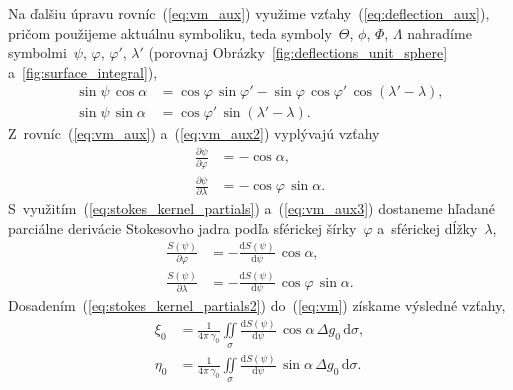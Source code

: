 \documentclass[a4paper,12pt]{book}
\newcommand{\diff}{\mathrm d}
\begin{document}
%
Na ďalšiu úpravu rovníc~(\ref{eq:vm_aux}) využime 
vzťahy~(\ref{eq:deflection_aux}), pričom použijeme aktuálnu symboliku, teda 
symboly~$\Theta$, $\phi$, $\Phi$, $\Lambda$ nahradíme symbolmi~$\psi$, 
$\varphi$, $\varphi'$, $\lambda'$ (porovnaj 
Obrázky~\ref{fig:deflections_unit_sphere} a~\ref{fig:surface_integral}),
%
\begin{equation}
\label{eq:vm_aux2}
\begin{split}
\sin\psi \, \cos\alpha &= \cos\varphi \, \sin\varphi' - \sin\varphi \, 
\cos\varphi' \, \cos(\lambda' - \lambda){,}\\
\sin\psi \, \sin\alpha &= \cos\varphi' \, \sin(\lambda' - \lambda){.}
\end{split}
\end{equation}
%
Z~rovníc~(\ref{eq:vm_aux}) a~(\ref{eq:vm_aux2}) vyplývajú vzťahy
%
\begin{equation}
\label{eq:vm_aux3}
\begin{split}
\frac{\partial\psi}{\partial\varphi} &= -\cos\alpha{,}\\
%
\frac{\partial\psi}{\partial\lambda} &= -\cos\varphi \, \sin\alpha{.}
\end{split}
\end{equation}
%
S~využitím~(\ref{eq:stokes_kernel_partials}) a~(\ref{eq:vm_aux3}) dostaneme 
hľadané parciálne derivácie Stokesovho jadra podľa sférickej šírky~$\varphi$ 
a~sférickej dĺžky~$\lambda$,
%
\begin{equation}
\label{eq:stokes_kernel_partials2}
\begin{split}
\frac{S(\psi)}{\partial\varphi} &= -\frac{\diff S(\psi)}{\diff \psi} \, 
\cos\alpha{,}\\
%
\frac{S(\psi)}{\partial\lambda} &= -\frac{\diff S(\psi)}{\diff \psi} \, 
\cos\varphi \, \sin\alpha{.}
\end{split}
\end{equation}
%
Dosadením~(\ref{eq:stokes_kernel_partials2}) do~(\ref{eq:vm}) získame výsledné 
vzťahy,
    \begin{equation}
\label{eq:vm2}
\begin{split}
\xi_0 &= \frac{1}{4\pi\,\gamma_0} \iint\limits_\sigma \frac{\diff 
S(\psi)}{\diff \psi} \, \cos\alpha \, \Delta g_0 \, \diff\sigma{,}\\
\eta_0 &= \frac{1}{4\pi\,\gamma_0} \iint\limits_\sigma \frac{\diff 
S(\psi)}{\diff \psi} \, \sin\alpha \, \Delta g_0 \, \diff\sigma{.}
\end{split}
\end{equation}
\end{document}
